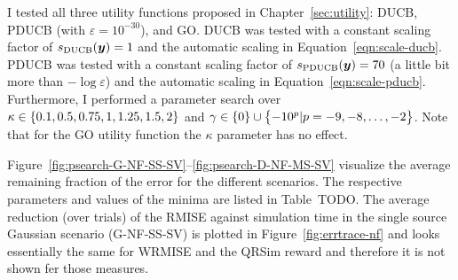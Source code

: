 I tested all three utility functions proposed in Chapter~\ref{sec:utility}: 
DUCB, PDUCB (with $\varepsilon = 10^{-30}$), and GO\@. DUCB was tested with 
a constant scaling factor of $s_{\mathrm{DUCB}}(\bm{y}) = 1$ and the automatic scaling 
in Equation~\ref{eqn:scale-ducb}.  PDUCB was tested with a constant scaling 
factor of $s_{\mathrm{PDUCB}}(\bm{y}) = 70$ (a little bit more than $-\log 
\varepsilon$) and the automatic scaling in Equation~\ref{eqn:scale-pducb}.  
Furthermore, I performed a parameter search over $\kappa \in \cbr{0.1, 0.5, 
0.75, 1, 1.25, 1.5, 2}$ and $\gamma \in \cbr{0} \cup \cbr{-10^p | p = -9, -8, 
  \dots, -2}$. Note that for the GO utility function the $\kappa$ parameter has 
no effect.

Figure~\ref{fig:psearch-G-NF-SS-SV}--\ref{fig:psearch-D-NF-MS-SV} visualize the 
average remaining fraction of the error for the different scenarios.  The 
respective parameters and values of the minima are listed in Table~TODO\@.  The 
average reduction (over trials) of the RMISE against simulation time in the 
single source Gaussian scenario (G-NF-SS-SV) is plotted in 
Figure~\ref{fig:errtrace-nf} and looks essentially the same for WRMISE and the 
QRSim reward and therefore it is not shown fer those measures.

